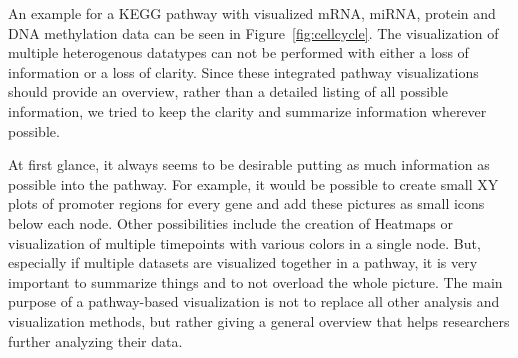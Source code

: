 \documentclass{bioinfo}
\begin{document}


An example for a KEGG pathway with visualized mRNA, miRNA, protein and DNA methylation data can be
seen in Figure~\ref{fig:cellcycle}. The visualization of multiple heterogenous datatypes can not be
performed with either a loss of information or a loss of clarity. Since these integrated pathway
visualizations should provide an overview, rather than a detailed listing of all possible
information, we tried to keep the clarity and summarize information wherever possible.

At first glance, it always seems to be desirable putting as much information as possible into the pathway. For example, it would be possible to create small XY plots of promoter regions for every gene and add these pictures as small icons below each node. Other possibilities include the creation of Heatmaps or visualization of multiple timepoints with various colors in a single node.
But, especially if multiple datasets are visualized together in a pathway, it is very important to summarize things and to not overload the whole picture. The main purpose of a pathway-based visualization is not to replace all other analysis and visualization methods, but rather giving a general overview that helps researchers further analyzing their data.
\end{document}
